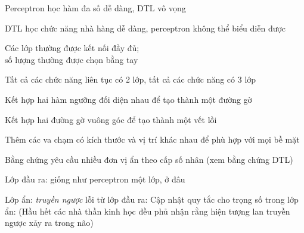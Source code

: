 \documentclass{article}
\begin{document}
\begin{huge}
\vspace*{0.5in}


Perceptron học hàm đa số dễ dàng, DTL vô vọng


DTL học chức năng nhà hàng dễ dàng, perceptron không thể biểu diễn được


Các lớp thường được kết nối đầy đủ;\\
số lượng  thường được chọn bằng tay

\vspace*{0.2in}

\textwidth
{}


Tất cả các chức năng liên tục có 2 lớp, tất cả các chức năng có 3 lớp

\vspace*{0.2in}


Kết hợp hai hàm ngưỡng đối diện nhau để tạo thành một đường gờ

Kết hợp hai đường gờ vuông góc để tạo thành một vết lồi

Thêm các va chạm có kích thước và vị trí khác nhau để phù hợp với mọi bề mặt

Bằng chứng yêu cầu nhiều đơn vị ẩn theo cấp số nhân (xem bằng chứng DTL)




Lớp đầu ra: giống như perceptron một lớp,
ở đâu 

Lớp ẩn: \emph{truyền ngược} lỗi từ lớp đầu ra:
\mat{\[
   \Delta_j = g'(\J{in}{}_j) \sum_i \w{j}{i} \Delta_i\ .
\]}
Cập nhật quy tắc cho trọng số trong lớp ẩn:
(Hầu hết các nhà thần kinh học đều phủ nhận rằng hiện tượng lan truyền ngược xảy ra trong não)


\end{huge}
\end{document}
